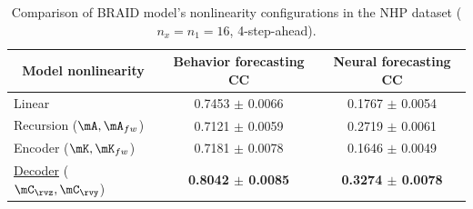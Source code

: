 \documentclass{article} %
\newcommand{\ourmethod}{BRAID}
\begin{document}



\begin{table}[h]
\caption{Comparison of \ourmethod{} model's nonlinearity configurations in the NHP dataset ($n_x=n_1=16$, 4-step-ahead).}
\label{tab: NLConfigs}
\begin{center}
\begin{tabular}{l|c|c}
\multicolumn{1}{c|}{\textbf{Model nonlinearity}} & \multicolumn{1}{c|}{\textbf{Behavior forecasting CC}} & \multicolumn{1}{c}{\textbf{Neural forecasting CC}} \\
\midrule
Linear & 0.7453 \(\pm\) 0.0066 & 0.1767 \(\pm\) 0.0054\\
Recursion (\(\mA, \mA_{fw}\)) & 0.7121 \(\pm\) 0.0059 & 0.2719 \(\pm\) 0.0061\\
Encoder (\(\mK, \mK_{fw}\)) & 0.7181 \(\pm\) 0.0078 & 0.1646 \(\pm\) 0.0049\\
\underline{Decoder} (\(\mC_{\rvz}, \mC_{\rvy}\)) & \textbf{0.8042 \(\pm\) 0.0085} & \textbf{0.3274 \(\pm\) 0.0078}\\
\end{tabular}
\end{center}
\end{table}
\end{document}
